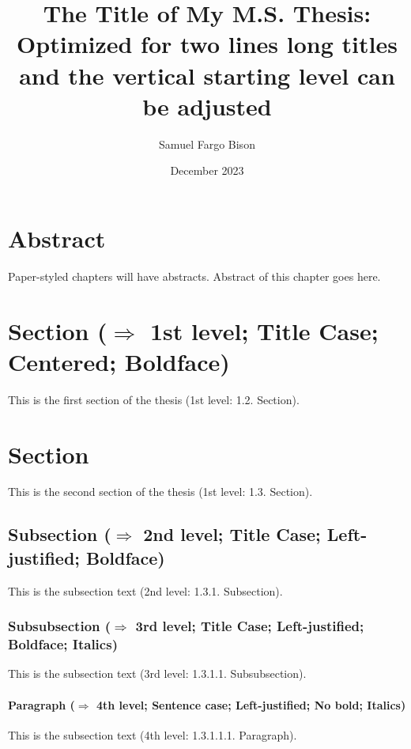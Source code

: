 \documentclass[ms-thesis,12pt]{ndsu-thesis-2022}
\title{The Title of My M.S. Thesis: Optimized for two lines long titles and the vertical starting level can be adjusted}
\author{Samuel Fargo Bison}
\date{December 2023}
\begin{document}

\section{Abstract}
Paper-styled chapters will have abstracts. Abstract of this chapter goes here. \kant[1]

\section{Section ($\Rightarrow$ 1st level; Title Case; Centered; Boldface)}
This is the first section of the thesis (1st level: 1.2. Section). \kant[2]

\section{Section}
This is the second section of the thesis (1st level: 1.3. Section). \kant[3]

\subsection{Subsection ($\Rightarrow$ 2nd level; Title Case; Left-justified; Boldface)}
This is the subsection text (2nd level: 1.3.1. Subsection). \kant[4]

\subsubsection{Subsubsection ($\Rightarrow$ 3rd level; Title Case; Left-justified; Boldface; Italics)}
This is the subsection text (3rd level: 1.3.1.1. Subsubsection). \kant[5]

\paragraph{Paragraph ($\Rightarrow$ 4th level; Sentence case; Left-justified; No bold; Italics)}
This is the subsection text (4th level: 1.3.1.1.1. Paragraph). \kant[6]
\end{document}
